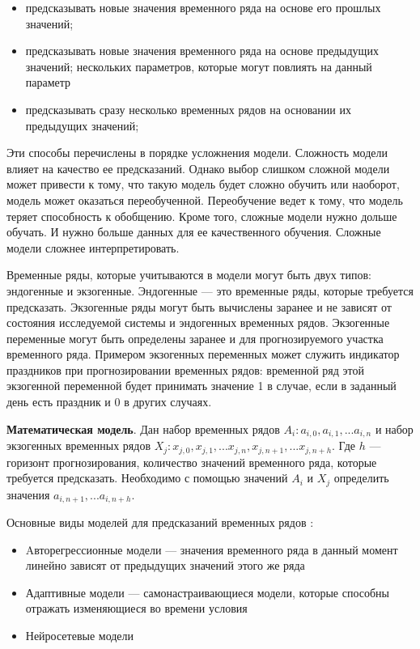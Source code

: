 \begin{itemize}
	\item предсказывать новые значения временного ряда на основе его прошлых значений;
	\item предсказывать новые значения временного ряда на основе предыдущих значений;
	нескольких параметров, которые могут повлиять на данный параметр
	\item предсказывать сразу несколько временных рядов на основании их предыдущих значений;
\end{itemize}

Эти способы перечислены в порядке усложнения модели. Сложность модели влияет на
качество ее предсказаний. Однако выбор слишком сложной модели может привести
к тому, что такую модель будет сложно обучить или наоборот, модель может оказаться
переобученной. Переобучение ведет к тому, что модель теряет способность
к обобщению. Кроме того, сложные модели нужно дольше обучать. И нужно больше данных
для ее качественного обучения. Сложные модели сложнее интерпретировать.

Временные ряды, которые учитываются в модели могут быть двух типов:
эндогенные и экзогенные. Эндогенные --- это временные ряды,
которые требуется предсказать. Экзогенные ряды могут быть вычислены
заранее и не зависят от состояния исследуемой системы и эндогенных временных рядов.
Экзогенные переменные могут быть определены заранее и для прогнозируемого участка временного ряда.
Примером экзогенных переменных может служить
индикатор праздников при прогнозировании временных рядов: временной ряд этой экзогенной переменной
будет принимать значение 1 в случае, если в заданный день есть праздник и 0 в других случаях.

\textbf{Математическая модель}. Дан набор временных рядов $ A_i: a_{i,0}, a_{i,1}, ... a_{i,n} $
и набор экзогенных временных рядов $ X_j: x_{j,0}, x_{j,1}, ... x_{j,n},  x_{j,n+1}, ...  x_{j,n+h} $.
Где $h$ --- горизонт прогнозирования, количество значений временного ряда, которые требуется предсказать.
Необходимо с помощью значений $ A_i $ и $ X_j $ определить значения $ a_{i,n+1}, ... a_{i,n+h} $.

Основные виды моделей для предсказаний временных рядов \cite{voron}:
\begin{itemize}
	\item Aвторегрессионные модели --- значения временного ряда в данный момент
	линейно зависят от предыдущих значений этого же ряда
	\item Адаптивные модели --- самонастраивающиеся модели,
	которые способны отражать изменяющиеся во времени условия
	\item Нейросетевые модели
\end{itemize}

